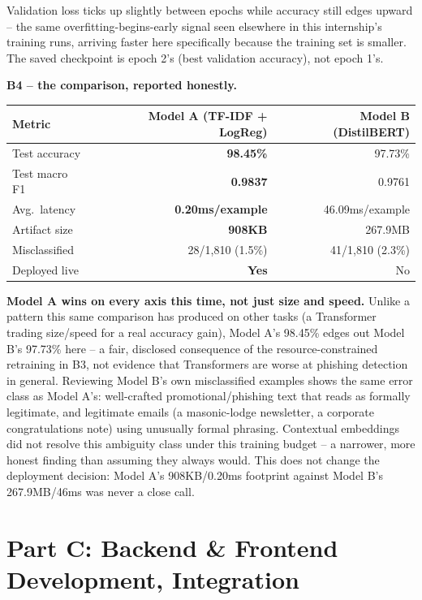 \documentclass[11pt,a4paper]{article}
\begin{document}
Validation loss ticks up slightly between epochs while accuracy still edges upward -- the
same overfitting-begins-early signal seen elsewhere in this internship's training runs,
arriving faster here specifically because the training set is smaller. The saved checkpoint
is epoch 2's (best validation accuracy), not epoch 1's.

\textbf{B4 -- the comparison, reported honestly.}

\begin{table}[H]
\centering
\small
\begin{tabular}{lrr}
\toprule
\textbf{Metric} & \textbf{Model A (TF-IDF + LogReg)} & \textbf{Model B (DistilBERT)} \\
\midrule
Test accuracy & \textbf{98.45\%} & 97.73\% \\
Test macro F1 & \textbf{0.9837} & 0.9761 \\
Avg.\ latency & \textbf{0.20ms/example} & 46.09ms/example \\
Artifact size & \textbf{908KB} & 267.9MB \\
Misclassified & 28/1{,}810 (1.5\%) & 41/1{,}810 (2.3\%) \\
Deployed live & \textbf{Yes} & No \\
\bottomrule
\end{tabular}
\end{table}

\textbf{Model A wins on every axis this time, not just size and speed.} Unlike a pattern
this same comparison has produced on other tasks (a Transformer trading size/speed for a
real accuracy gain), Model A's 98.45\% edges out Model B's 97.73\% here -- a fair, disclosed
consequence of the resource-constrained retraining in B3, not evidence that Transformers are
worse at phishing detection in general. Reviewing Model B's own misclassified examples shows
the same error class as Model A's: well-crafted promotional/phishing text that reads as
formally legitimate, and legitimate emails (a masonic-lodge newsletter, a corporate
congratulations note) using unusually formal phrasing. Contextual embeddings did not
resolve this ambiguity class under this training budget -- a narrower, more honest finding
than assuming they always would. This does not change the deployment decision: Model A's
908KB/0.20ms footprint against Model B's 267.9MB/46ms was never a close call.

\section*{Part C: Backend \& Frontend Development, Integration}
\end{document}
